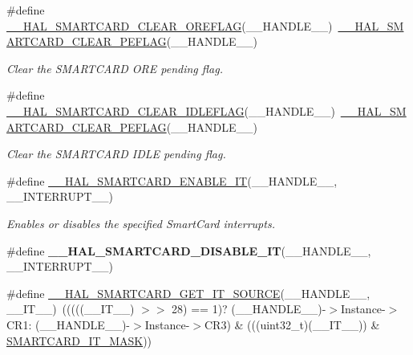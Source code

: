 \begin{DoxyCompactItemize}
\#define \hyperlink{group___s_m_a_r_t_c_a_r_d___exported___macros_gaa645ab03b85a13098a4e597f525e9f02}{\+\_\+\+\_\+\+H\+A\+L\+\_\+\+S\+M\+A\+R\+T\+C\+A\+R\+D\+\_\+\+C\+L\+E\+A\+R\+\_\+\+O\+R\+E\+F\+L\+AG}(\+\_\+\+\_\+\+H\+A\+N\+D\+L\+E\+\_\+\+\_\+)~\hyperlink{group___s_m_a_r_t_c_a_r_d___exported___macros_gae74183878abc11bff63af74fc3ffa3a3}{\+\_\+\+\_\+\+H\+A\+L\+\_\+\+S\+M\+A\+R\+T\+C\+A\+R\+D\+\_\+\+C\+L\+E\+A\+R\+\_\+\+P\+E\+F\+L\+AG}(\+\_\+\+\_\+\+H\+A\+N\+D\+L\+E\+\_\+\+\_\+)
\begin{DoxyCompactList}\small\item\em Clear the S\+M\+A\+R\+T\+C\+A\+RD O\+RE pending flag. \end{DoxyCompactList}\item 
\#define \hyperlink{group___s_m_a_r_t_c_a_r_d___exported___macros_ga20777f06c3aaad7872cd3d655f021f45}{\+\_\+\+\_\+\+H\+A\+L\+\_\+\+S\+M\+A\+R\+T\+C\+A\+R\+D\+\_\+\+C\+L\+E\+A\+R\+\_\+\+I\+D\+L\+E\+F\+L\+AG}(\+\_\+\+\_\+\+H\+A\+N\+D\+L\+E\+\_\+\+\_\+)~\hyperlink{group___s_m_a_r_t_c_a_r_d___exported___macros_gae74183878abc11bff63af74fc3ffa3a3}{\+\_\+\+\_\+\+H\+A\+L\+\_\+\+S\+M\+A\+R\+T\+C\+A\+R\+D\+\_\+\+C\+L\+E\+A\+R\+\_\+\+P\+E\+F\+L\+AG}(\+\_\+\+\_\+\+H\+A\+N\+D\+L\+E\+\_\+\+\_\+)
\begin{DoxyCompactList}\small\item\em Clear the S\+M\+A\+R\+T\+C\+A\+RD I\+D\+LE pending flag. \end{DoxyCompactList}\item 
\#define \hyperlink{group___s_m_a_r_t_c_a_r_d___exported___macros_gaa80e83666a04249e0c7ca26d036a0d3b}{\+\_\+\+\_\+\+H\+A\+L\+\_\+\+S\+M\+A\+R\+T\+C\+A\+R\+D\+\_\+\+E\+N\+A\+B\+L\+E\+\_\+\+IT}(\+\_\+\+\_\+\+H\+A\+N\+D\+L\+E\+\_\+\+\_\+,  \+\_\+\+\_\+\+I\+N\+T\+E\+R\+R\+U\+P\+T\+\_\+\+\_\+)
\begin{DoxyCompactList}\small\item\em Enables or disables the specified Smart\+Card interrupts. \end{DoxyCompactList}\item 
\#define {\bfseries \+\_\+\+\_\+\+H\+A\+L\+\_\+\+S\+M\+A\+R\+T\+C\+A\+R\+D\+\_\+\+D\+I\+S\+A\+B\+L\+E\+\_\+\+IT}(\+\_\+\+\_\+\+H\+A\+N\+D\+L\+E\+\_\+\+\_\+,  \+\_\+\+\_\+\+I\+N\+T\+E\+R\+R\+U\+P\+T\+\_\+\+\_\+)
\item 
\#define \hyperlink{group___s_m_a_r_t_c_a_r_d___exported___macros_ga8bae0fc7f068414790697698adafc4f2}{\+\_\+\+\_\+\+H\+A\+L\+\_\+\+S\+M\+A\+R\+T\+C\+A\+R\+D\+\_\+\+G\+E\+T\+\_\+\+I\+T\+\_\+\+S\+O\+U\+R\+CE}(\+\_\+\+\_\+\+H\+A\+N\+D\+L\+E\+\_\+\+\_\+,  \+\_\+\+\_\+\+I\+T\+\_\+\+\_\+)~(((((\+\_\+\+\_\+\+I\+T\+\_\+\+\_\+) $>$$>$ 28) == 1)? (\+\_\+\+\_\+\+H\+A\+N\+D\+L\+E\+\_\+\+\_\+)-\/$>$Instance-\/$>$C\+R1\+: (\+\_\+\+\_\+\+H\+A\+N\+D\+L\+E\+\_\+\+\_\+)-\/$>$Instance-\/$>$C\+R3) \& (((uint32\+\_\+t)(\+\_\+\+\_\+\+I\+T\+\_\+\+\_\+)) \& \hyperlink{group___s_m_a_r_t_c_a_r_d___private___constants_ga2d4be8e0259fd370f82c53579c96ede5}{S\+M\+A\+R\+T\+C\+A\+R\+D\+\_\+\+I\+T\+\_\+\+M\+A\+SK}))
$$
\end{DoxyCompactItemize}
